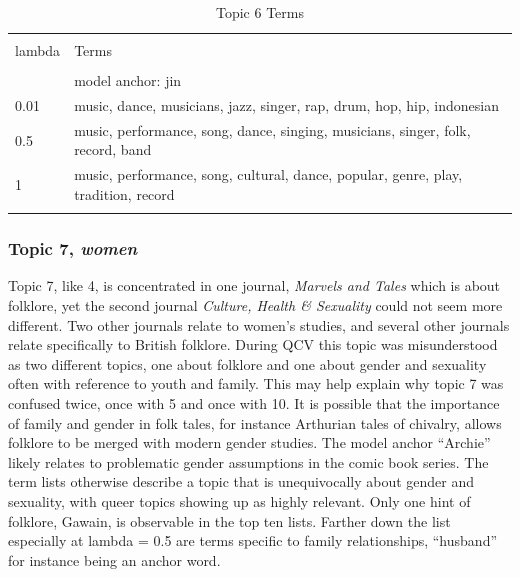 \documentclass[]{book}
\theoremstyle{definition}
\theoremstyle{definition}
\theoremstyle{definition}
\theoremstyle{remark}
\begin{document}
\begin{table}[!htbp] \centering 
  \caption{Topic 6 Terms} 
  \label{tab:t6d} 
\begin{tabularx}{\textwidth}{@{\extracolsep{5pt}} lY} 
\\[-1.8ex]\hline 
\hline \\[-1.8ex] 
lambda & Terms \\ 
\hline \\[-1.8ex] 
 & model anchor: jin \\ 
0.01 & music, dance, musicians, jazz, singer, rap, drum, hop, hip, indonesian \\ 
0.5 & music, performance, song, dance, singing, musicians, singer, folk, record, band \\ 
1 & music, performance, song, cultural, dance, popular, genre, play, tradition, record \\ 
\hline \\[-1.8ex] 
\end{tabularx} 
\end{table}

\hypertarget{topic-7-women}{%
\subsubsection{\texorpdfstring{Topic 7,
\emph{women}}{Topic 7, women}}\label{topic-7-women}}

Topic 7, like 4, is concentrated in one journal, \emph{Marvels and
Tales} which is about folklore, yet the second journal \emph{Culture,
Health \& Sexuality} could not seem more different. Two other journals
relate to women's studies, and several other journals relate
specifically to British folklore. During QCV this topic was
misunderstood as two different topics, one about folklore and one about
gender and sexuality often with reference to youth and family. This may
help explain why topic 7 was confused twice, once with 5 and once with
10. It is possible that the importance of family and gender in folk
tales, for instance Arthurian tales of chivalry, allows folklore to be
merged with modern gender studies. The model anchor ``Archie'' likely
relates to problematic gender assumptions in the comic book series. The
term lists otherwise describe a topic that is unequivocally about gender
and sexuality, with queer topics showing up as highly relevant. Only one
hint of folklore, Gawain, is observable in the top ten lists. Farther
down the list especially at lambda = 0.5 are terms specific to family
relationships, ``husband'' for instance being an anchor word.
\end{document}

